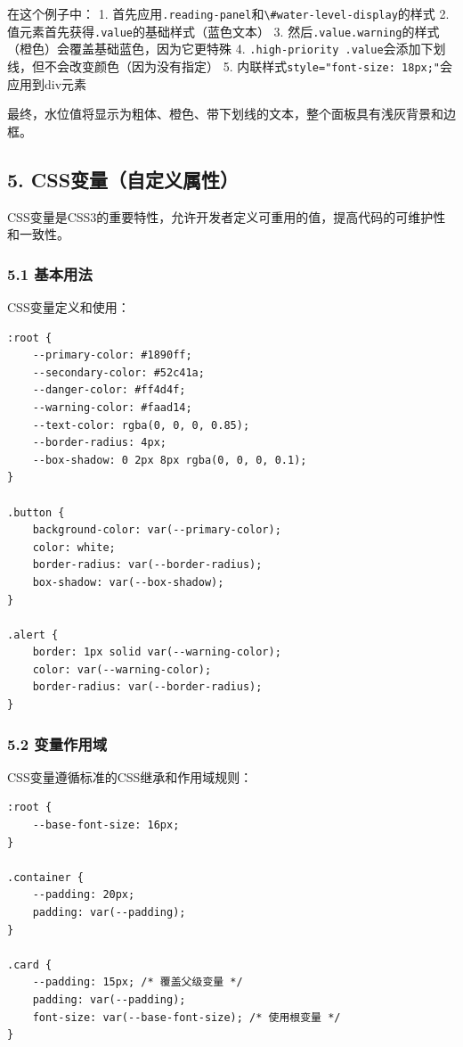 在这个例子中： 1.
首先应用\passthrough{\lstinline!.reading-panel!}和\passthrough{\lstinline!\#water-level-display!}的样式
2. 值元素首先获得\passthrough{\lstinline!.value!}的基础样式（蓝色文本）
3.
然后\passthrough{\lstinline!.value.warning!}的样式（橙色）会覆盖基础蓝色，因为它更特殊
4.
\passthrough{\lstinline!.high-priority .value!}会添加下划线，但不会改变颜色（因为没有指定）
5.
内联样式\passthrough{\lstinline!style="font-size: 18px;"!}会应用到div元素

最终，水位值将显示为粗体、橙色、带下划线的文本，整个面板具有浅灰背景和边框。

\subsection{5.
CSS变量（自定义属性）}\label{cssux53d8ux91cfux81eaux5b9aux4e49ux5c5eux6027}

CSS变量是CSS3的重要特性，允许开发者定义可重用的值，提高代码的可维护性和一致性。

\subsubsection{5.1 基本用法}\label{ux57faux672cux7528ux6cd5}

CSS变量定义和使用：

\begin{lstlisting}
:root {
    --primary-color: #1890ff;
    --secondary-color: #52c41a;
    --danger-color: #ff4d4f;
    --warning-color: #faad14;
    --text-color: rgba(0, 0, 0, 0.85);
    --border-radius: 4px;
    --box-shadow: 0 2px 8px rgba(0, 0, 0, 0.1);
}

.button {
    background-color: var(--primary-color);
    color: white;
    border-radius: var(--border-radius);
    box-shadow: var(--box-shadow);
}

.alert {
    border: 1px solid var(--warning-color);
    color: var(--warning-color);
    border-radius: var(--border-radius);
}
\end{lstlisting}

\subsubsection{5.2 变量作用域}\label{ux53d8ux91cfux4f5cux7528ux57df}

CSS变量遵循标准的CSS继承和作用域规则：

\begin{lstlisting}
:root {
    --base-font-size: 16px;
}

.container {
    --padding: 20px;
    padding: var(--padding);
}

.card {
    --padding: 15px; /* 覆盖父级变量 */
    padding: var(--padding);
    font-size: var(--base-font-size); /* 使用根变量 */
}
\end{lstlisting}


